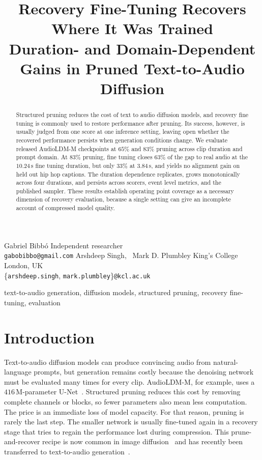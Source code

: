 \documentclass{article}
\begin{document}
\ninept

\title{Recovery Fine-Tuning Recovers Where It Was Trained\\
Duration- and Domain-Dependent Gains in Pruned Text-to-Audio Diffusion}

\twoauthors
  {Gabriel Bibb\'o}
  {Independent researcher \\
   \texttt{gabobibbo@gmail.com}}
  {Arshdeep Singh, \, Mark D. Plumbley}
  {King's College London, UK \\
   \{\texttt{arshdeep.singh}, \texttt{mark.plumbley}\}\texttt{@kcl.ac.uk}}

\maketitle

\begin{abstract}
Structured pruning reduces the cost of text to audio diffusion models, and recovery fine tuning is commonly used to restore performance after pruning. Its success, however, is usually judged from one score at one inference setting, leaving open whether the recovered performance persists when generation conditions change. We evaluate released AudioLDM-M checkpoints at $65\%$ and $83\%$ pruning across clip duration and prompt domain. At $83\%$ pruning, fine tuning closes $63\%$ of the gap to real audio at the $10.24$\,s fine tuning duration, but only $33\%$ at $3.84$\,s, and yields no alignment gain on held out hip hop captions. The duration dependence replicates, grows monotonically across four durations, and persists across scorers, event level metrics, and the published sampler. These results establish operating point coverage as a necessary dimension of recovery evaluation, because a single setting can give an incomplete account of compressed model quality.
\end{abstract}

\begin{keywords}
text-to-audio generation, diffusion models, structured pruning, recovery fine-tuning, evaluation
\end{keywords}

\section{Introduction}
Text-to-audio diffusion models can produce convincing audio from natural-language prompts, but generation remains costly because the denoising network must be evaluated many times for every clip. AudioLDM-M, for example, uses a $416$\,M-parameter U-Net~\cite{liu2023audioldm}. Structured pruning reduces this cost by removing complete channels or blocks, so fewer parameters also mean less computation. The price is an immediate loss of model capacity. For that reason, pruning is rarely the last step. The smaller network is usually fine-tuned again in a recovery stage that tries to regain the performance lost during compression. This prune-and-recover recipe is now common in image diffusion~\cite{fang2023diffpruning,kim2024bksdm,fang2025tinyfusion} and has recently been transferred to text-to-audio generation~\cite{singh2026pruning}.
\end{document}
